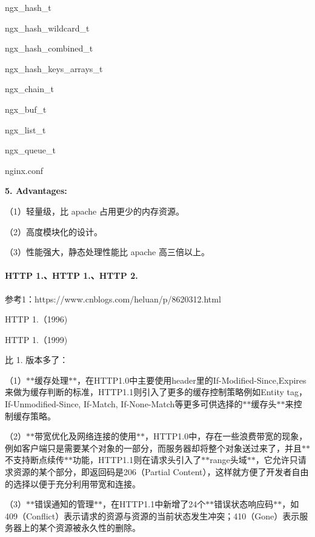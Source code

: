 ngx\+\_\+hash\+\_\+t

ngx\+\_\+hash\+\_\+wildcard\+\_\+t

ngx\+\_\+hash\+\_\+combined\+\_\+t

ngx\+\_\+hash\+\_\+keys\+\_\+arrays\+\_\+t

ngx\+\_\+chain\+\_\+t

ngx\+\_\+buf\+\_\+t

ngx\+\_\+list\+\_\+t

ngx\+\_\+queue\+\_\+t

nginx.\+conf

{\bfseries 5. Advantages\+:}

（1）轻量级，比 apache 占用更少的内存资源。

（2）高度模块化的设计。

（3）性能强大，静态处理性能比 apache 高三倍以上。





\paragraph*{H\+T\+TP 1.、\+H\+T\+TP 1.、\+H\+T\+TP 2.}

参考1：https\+://www.cnblogs.\+com/heluan/p/8620312.html


\begin{DoxyEnumerate}
\item H\+T\+TP 1.（1996)
\item H\+T\+TP 1.（1999)
\end{DoxyEnumerate}

比 1. 版本多了：

（1）$\ast$$\ast$缓存处理$\ast$$\ast$，在\+H\+T\+T\+P1.0中主要使用header里的\+If-\/\+Modified-\/\+Since,Expires来做为缓存判断的标准，\+H\+T\+T\+P1.1则引入了更多的缓存控制策略例如\+Entity tag，\+If-\/\+Unmodified-\/\+Since, If-\/\+Match, If-\/\+None-\/\+Match等更多可供选择的$\ast$$\ast$缓存头$\ast$$\ast$来控制缓存策略。

（2）$\ast$$\ast$带宽优化及网络连接的使用$\ast$$\ast$，\+H\+T\+T\+P1.0中，存在一些浪费带宽的现象，例如客户端只是需要某个对象的一部分，而服务器却将整个对象送过来了，并且$\ast$$\ast$不支持断点续传$\ast$$\ast$功能，\+H\+T\+T\+P1.1则在请求头引入了$\ast$$\ast$range头域$\ast$$\ast$，它允许只请求资源的某个部分，即返回码是206（\+Partial Content），这样就方便了开发者自由的选择以便于充分利用带宽和连接。

（3）$\ast$$\ast$错误通知的管理$\ast$$\ast$，在\+H\+T\+T\+P1.1中新增了24个$\ast$$\ast$错误状态响应码$\ast$$\ast$，如409（\+Conflict）表示请求的资源与资源的当前状态发生冲突；410（\+Gone）表示服务器上的某个资源被永久性的删除。

